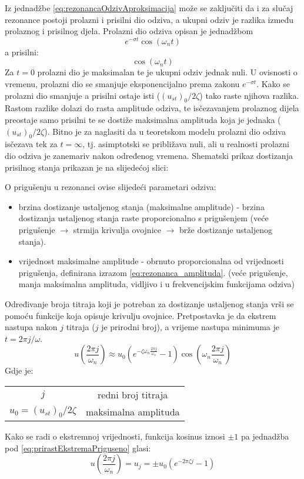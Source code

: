 Iz jednadžbe \eqref{eq:rezonancaOdzivAproksimacija} može se zaključiti da i za
slučaj rezonance postoji prolazni i prisilni dio odziva, a ukupni odziv je razlika
između prolaznog i prisilnog djela. 
Prolazni dio odziva opisan je jednadžbom
\[
    e^{-\sigma t} \cos(\omega_n t)
\]
a prisilni:
\[
    \cos(\omega_n t)
\]
Za $t=0$ prolazni dio je maksimalan te je ukupni odziv jednak nuli. U ovisnosti o
vremenu, prolazni dio se smanjuje eksponencijalno prema zakonu $e^{-\sigma t}$. Kako
se prolazni dio smanjuje a prisilni ostaje isti ($(u_{st})_0/2\zeta$) tako raste
njihova razlika. Rastom razlike dolazi do rasta amplitude odziva, te isčezavanjem
prolaznog dijela preostaje samo prisilni te se dostiže maksimalna amplituda koja je
jednaka ($(u_{st})_0/2\zeta$). Bitno je za naglasiti da u teoretskom modelu
prolazni dio odziva isčezava tek za $t=\infty$, tj. asimptotski se približava nuli,
ali u realnosti prolazni dio odziva je zanemariv nakon određenog vremena. Shematski
prikaz dostizanja prisilnog stanja prikazan je na slijedećoj slici:

O prigušenju u rezonanci ovise slijedeći parametari odziva:
\begin{itemize}
    \item brzina dostizanje ustaljenog stanja (maksimalne amplitude) - brzina dostizanja 
        ustaljenog stanja raste proporcionalno s prigušenjem (veće prigušenje $\to$ strmija krivulja
        ovojnice $\to$ brže dostizanje ustaljenog stanja).

    \item vrijednost maksimalne amplitude - obrnuto proporcionalna od vrijednosti
        prigušenja, definirana izrazom \eqref{eq:rezonanca_amplituda}. 
        (veće prigušenje, manja maksimalna amplituda, vidljivo i u frekvencijskim funkcijama odziva)
\end{itemize}

Određivanje broja titraja koji je potreban za dostizanje ustaljenog stanja vrši
se pomoću funkcije koja opisuje krivulju ovojnice. Pretpostavka je da ekstrem
nastupa nakon $j$ titraja ($j$ je prirodni broj), a vrijeme nastupa minimuma je
$t=2\pi j/\omega$. 
\begin{equation}\label{eq:prirastEkstremaPriguseno}
    u\left(\frac{2\pi j}{\omega_n}\right) \approx
        u_0(e^{-\zeta\omega_n\frac{2\pi j}{\omega_n}}-1)\cos\left(\omega_n\frac{2\pi
        j}{\omega_n}\right)
\end{equation}
Gdje je:
\begin{table}[H]
    \begin{tabular}{c c}
        $j$ & redni broj titraja\\
        $u_0=(u_{st})_0/2\zeta$ & maksimalna amplituda\\
    \end{tabular}
\end{table}
Kako se radi o ekstremnoj vrijednosti, funkcija kosinus iznosi $\pm 1$ pa jednadžba
pod \eqref{eq:prirastEkstremaPriguseno} glasi:
\begin{equation}\label{eq:MiniMaxPriguseno}
     u\left(\frac{2\pi j}{\omega_n}\right) = u_j = 
        \pm u_0(e^{-2\pi\zeta j}-1)
\end{equation}

